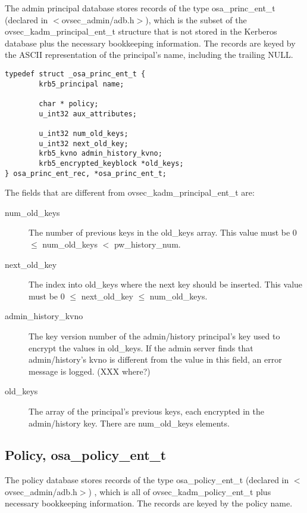 The admin principal database stores records of the type
osa_princ_ent_t (declared in $<$ovsec_admin/adb.h$>$), which is the
subset of the ovsec_kadm_principal_ent_t structure that is not stored
in the Kerberos database plus the necessary bookkeeping information.
The records are keyed by the ASCII representation of the principal's
name, including the trailing NULL.

\begin{verbatim}
typedef struct _osa_princ_ent_t {
        krb5_principal name;

        char * policy;
        u_int32 aux_attributes;

        u_int32 num_old_keys;
        u_int32 next_old_key;
        krb5_kvno admin_history_kvno;
        krb5_encrypted_keyblock *old_keys;
} osa_princ_ent_rec, *osa_princ_ent_t;
\end{verbatim}

The fields that are different from ovsec_kadm_principal_ent_t are:

\begin{description}
\item[num_old_keys] The number of previous keys in the old_keys array.
This value must be 0 $\le$ num_old_keys $<$ pw_history_num.

\item[next_old_key] The index into old_keys where the next key should
be inserted.  This value must be 0 $\le$ next_old_key $\le$
num_old_keys.

\item[admin_history_kvno] The key version number of the admin/history
principal's key used to encrypt the values in old_keys.  If the admin
server finds that admin/history's kvno is different from the value in
this field, an error message is logged.  (XXX where?)

\item[old_keys] The array of the principal's previous keys, each
encrypted in the admin/history key.  There are num_old_keys elements.
\end{description}

\subsection{Policy, osa_policy_ent_t}

The policy database stores records of the type osa_policy_ent_t
(declared in $<$ovsec_admin/adb.h$>$) , which is all of
ovsec_kadm_policy_ent_t plus necessary bookkeeping information.  The
records are keyed by the policy name.

